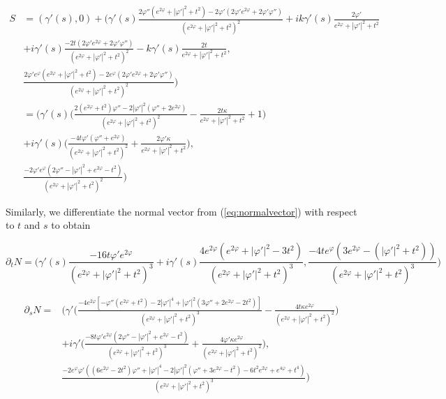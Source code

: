 \documentclass[12pt]{amsart}
\begin{document}
\begin{equation}\label{eq:Svector}
\begin{split}
    S &= (\gamma'(s),0) + \bigg( \gamma'(s) \frac{2\varphi''(e^{2\varphi}+|\varphi'|^2+t^2) - 2\varphi'(2\varphi'e^{2\varphi} + 2\varphi'\varphi'')}{(e^{2\varphi}+|\varphi'|^2+t^2)^2} + ik\gamma'(s) \frac{2\varphi'}{e^{2\varphi}+|\varphi'|^2+t^2}
    \\& + i\gamma'(s) \frac{-2t(2\varphi'e^{2\varphi}+2\varphi'\varphi'')}{(e^{2\varphi}+|\varphi'|^2+t^2)^2} -k\gamma'(s)\frac{2t}{e^{2\varphi}+|\varphi'|^2+t^2},
    \\& \frac{2\varphi'e^{\varphi}(e^{2\varphi}+|\varphi'|^2+t^2) - 2e^{\varphi}(2\varphi'e^{2\varphi}+2\varphi'\varphi'')}{(e^{2\varphi}+|\varphi'|^2+t^2)^2} \bigg)\\
    &= \bigg(\gamma'(s)\bigg(\frac{2 (e^{2\varphi} + t^2) \varphi'' - 2 |\varphi'|^2 (\varphi'' + 2 e^{2\varphi})}{(e^{2\varphi}+|\varphi'|^2+t^2)^2} - \frac{2t\kappa}{e^{2\varphi} + |\varphi'|^2+t^2} + 1\bigg)
    \\&+ i\gamma'(s)\bigg(\frac{-4t\varphi'(\varphi''+e^{2\varphi})}{(e^{2\varphi}+|\varphi'|^2+t^2)^2}  + \frac{2\varphi'\kappa}{e^{2\varphi} + |\varphi'|^2+t^2} \bigg),
    \\&\frac{-2\varphi'e^{\varphi}(2\varphi''-|\varphi'|^2+e^{2\varphi} -t^2)}{(e^{2\varphi}+|\varphi'|^2+t^2)^2}\bigg)
\end{split}
\end{equation}


Similarly, we differentiate the normal vector from (\ref{eq:normalvector}) with respect to $t$ and $s$ to obtain

\begin{equation}\label{eq:partialTN}
    \partial_tN=\bigg(\gamma'(s)\frac{-16t\varphi'e^{2\varphi}}{(e^{2\varphi}+|\varphi'|^2+t^2)^3}
    +i\gamma'(s)\frac{4e^{2\varphi}(e^{2\varphi}+|\varphi'|^2-3t^2)}{(e^{2\varphi}+|\varphi'|^2+t^2)^3}
    ,\frac{-4te^{\varphi}(3e^{2\varphi}-(|\varphi'|^2+t^2))}{(e^{2\varphi}+|\varphi'|^2+t^2)^3}\bigg)
\end{equation}

\begin{equation}\label{eq:partialSN}
\begin{split}
    \partial_sN=&\bigg(\gamma'\bigg(\frac{-4e^{2\varphi}[-\varphi''(e^{2\varphi}+t^2) -2|\varphi'|^4 +|\varphi'|^2(3\varphi'' +2e^{2\varphi} -2t^2) ]}{(e^{2\varphi}+|\varphi'|^2+t^2)^3} - \frac{4t\kappa e^{2\varphi}}{(e^{2\varphi}+|\varphi'|^2+t^2)^2}\bigg)
    \\&+i\gamma'\bigg(\frac{-8t\varphi'e^{2\varphi}(2 \varphi'' - |\varphi'|^2 + e^{2 \varphi} - t^2)}{(e^{2\varphi}+|\varphi'|^2+t^2)^3}  + \frac{4\varphi'\kappa e^{2\varphi}}{(e^{2\varphi}+|\varphi'|^2+t^2)^2}\bigg),
    \\&\frac{-2 e^{\varphi} \varphi' ((6 e^{2\varphi} - 2 t^2) \varphi'' + |\varphi'|^4 - 2 |\varphi'|^2 (\varphi'' + 3 e^{2\varphi} - t^2) - 6 t^2 e^{2\varphi} + e^{4\varphi} + t^4)}{(e^{2\varphi}+|\varphi'|^2+t^2)^3}\bigg)
\end{split}
\end{equation}
\end{document}
